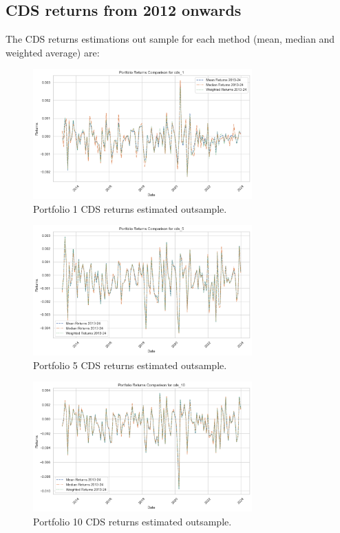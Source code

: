 \documentclass{article}
\begin{document}
\subsection*{CDS returns from 2012 onwards}

The CDS returns estimations out sample for each method (mean, median and weighted average) are:

\begin{figure}[H]
    \centering
    \includegraphics[width=0.75\textwidth]{../assets/returns_cds1_2013_2024.png}
    \caption{\label{fig:myplot}Portfolio 1 CDS returns estimated outsample.}
    \end{figure}

\begin{figure}[H]
    \centering
    \includegraphics[width=0.75\textwidth]{../assets/returns_cds5_2013_2024.png}
    \caption{\label{fig:myplot}Portfolio 5 CDS returns estimated outsample.}
    \end{figure}    

\begin{figure}[H]
    \centering
    \includegraphics[width=0.75\textwidth]{../assets/returns_cds10_2013_2024.png}
    \caption{\label{fig:myplot}Portfolio 10 CDS returns estimated outsample.}
    \end{figure}
\end{document}
